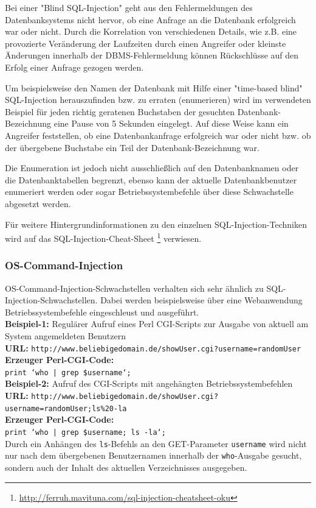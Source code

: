 
Bei einer "Blind SQL-Injection" geht aus den Fehlermeldungen des 
Datenbanksystems nicht hervor, ob eine Anfrage an die Datenbank 
erfolgreich war oder nicht. Durch die Korrelation von verschiedenen 
Details, wie z.B. eine provozierte Veränderung der Laufzeiten durch 
einen Angreifer oder kleinste Änderungen innerhalb der 
DBMS-Fehlermeldung können Rückschlüsse auf den Erfolg einer Anfrage 
gezogen werden.
 
Um beispielsweise den Namen der Datenbank mit Hilfe einer 
"time-based blind" SQL-Injection herauszufinden bzw. zu erraten 
(enumerieren) wird im verwendeten Beispiel für jeden richtig geratenen 
Buchstaben der gesuchten Datenbank-Bezeichnung eine Pause von 5 Sekunden 
eingelegt. Auf diese Weise kann ein Angreifer feststellen, ob eine 
Datenbankanfrage erfolgreich war oder nicht bzw. ob der übergebene 
Buchstabe ein Teil der Datenbank-Bezeichnung war. 

Die Enumeration ist jedoch nicht ausschließlich auf den Datenbanknamen 
oder die Datenbanktabellen begrenzt, ebenso kann der aktuelle 
Datenbankbenutzer enumeriert werden oder sogar Betriebssystembefehle 
über diese Schwachstelle abgesetzt werden.

Für weitere Hintergrundinformationen zu den einzelnen 
SQL-Injection-Techniken wird auf das SQL-Injection-Cheat-Sheet
\footnote{\url{http://ferruh.mavituna.com/sql-injection-cheatsheet-oku}} 
verwiesen.

\subsubsection{OS-Command-Injection}

OS-Command-Injection-Schwachstellen verhalten sich sehr ähnlich zu 
SQL-Injection-Schwachstellen. Dabei werden beispielsweise über eine 
Webanwendung Betriebssystembefehle eingeschleust und ausgeführt.
\\
\textbf{Beispiel-1:} Regulärer Aufruf eines Perl CGI-Scripts zur Ausgabe von aktuell am System angemeldeten Benutzern
\\
\textbf{URL:} \texttt{http://www.beliebigedomain.de/showUser.cgi?username=randomUser}
\\
\textbf{Erzeuger Perl-CGI-Code:}
\\
\texttt{\footnotesize{print `who | grep \$username`;}}
\\
\textbf{Beispiel-2:} Aufruf des CGI-Scripts mit angehängten Betriebssystembefehlen
\\
\textbf{URL:} \texttt{http://www.beliebigedomain.de/showUser.cgi?\\username=randomUser;ls\%20-la}
\\
\textbf{Erzeuger Perl-CGI-Code:}
\\
\texttt{\footnotesize{print `who | grep \$username; ls -la`;}}
\\
Durch ein Anhängen des \texttt{ls}-Befehls an den GET-Parameter 
\texttt{username} wird nicht nur nach dem übergebenen Benutzernamen 
innerhalb der \texttt{who}-Ausgabe gesucht, sondern auch der Inhalt 
des aktuellen Verzeichnisses ausgegeben.

